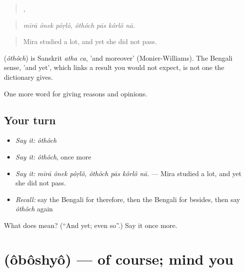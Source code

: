 \begin{quote}
  ,    
\end{quote}

\begin{quote}
\emph{mīrā ônek pôṛlô, ôthôch pās kôrlô nā.}
\end{quote}

\begin{quote}
Mira studied a lot, and yet she did not pass.
\end{quote}

\begin{cousinweb}
\textbf{} (\emph{ôthôch}) is Sanskrit \emph{atha ca}, 'and moreover' (Monier-Williams). The Bengali sense, 'and yet', which links a result you would not expect, is not one the dictionary gives.
\end{cousinweb}

\begin{grammarlens}[title={What you've built}]
One more word for giving reasons and opinions.
\end{grammarlens}

\subsection*{Your turn}
\begin{itemize}
\raggedright
  \item \emph{Say it:} \emph{ôthôch}
  \item \emph{Say it:} \emph{ôthôch}, once more
  \item \emph{Say it:} \emph{mīrā ônek pôṛlô, ôthôch pās kôrlô nā.} — Mira studied a lot, and yet she did not pass.
  \item \emph{Recall:} say the Bengali for therefore, then the Bengali for besides, then say \emph{ôthôch} again
\end{itemize}

\begin{tcolorbox}[breakable,colback=teal!4,colframe=teal!35!black,title={Before you move on}]
What does  mean? (\textquotedblleft{}And yet; even so\textquotedblright{}.) Say it once more.
\end{tcolorbox}
\section[\texorpdfstring{\bn{অবশ্য} (ôbôshyô)}{অবশ্য (ôbôshyô)}]{ (ôbôshyô) — of course; mind you}

